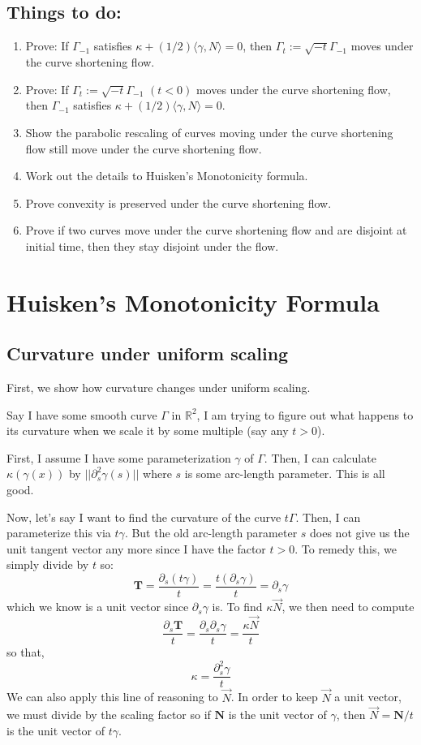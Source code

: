 \documentclass{article}
\begin{document}
\subsection{Things to do:}
\begin{enumerate}
    \item Prove: If $\Gamma_{-1}$ satisfies $\kappa + (1/2)\langle \gamma, N\rangle = 0$, then $\Gamma_t := \sqrt{-t}\Gamma_{-1}$ moves under the curve shortening flow.
    \item Prove: If $\Gamma_t := \sqrt{-t}\Gamma_{-1}$ $(t < 0)$ moves under the curve shortening flow, then $\Gamma_{-1}$ satisfies 
        $\kappa + (1/2)\langle\gamma,N\rangle = 0$.
    \item Show the parabolic rescaling of curves moving under the curve shortening flow still move under the curve shortening flow.
    \item Work out the details to Huisken's Monotonicity formula.
    \item Prove convexity is preserved under the curve shortening flow.
    \item Prove if two curves move under the curve shortening flow and are disjoint at initial time, then they stay disjoint under the flow.
\end{enumerate}

\section{Huisken's Monotonicity Formula}

\subsection{Curvature under uniform scaling}

First, we show how curvature changes under uniform scaling.

Say I have some smooth curve $\Gamma$ in $\mathbb{R}^2$, I am trying to figure out what happens to its curvature when we scale it by some multiple (say any $t>0$). 

First, I assume I have some parameterization $\gamma$ of $\Gamma$. Then, I can calculate $\kappa (\gamma(x))$ by $||\partial_s^2 \gamma(s)||$ where $s$ is 
some arc-length parameter. This is all good.

Now, let's say I want to find the curvature of the curve $t\Gamma$. Then,
I can parameterize this via $t\gamma$. But the old arc-length parameter $s$ does not give us the unit tangent vector any more since I have the factor $t>0$. 
To remedy this, we simply divide by $t$ so:
\[ \mathbf{T} = \frac{\partial_s(t\gamma)}{t}= \frac{t(\partial_s \gamma)}{t} = \partial_s \gamma \]
which we know is a unit vector since $\partial_s \gamma$ is. To find $\kappa \vec{N}$, we then need to compute 
\[ \frac{\partial_s\mathbf{T}}{t} = \frac{\partial_s \partial_s \gamma}{t} = \frac{\kappa\vec{N}}{t} \]
so that,
\[ \kappa = \frac{\partial_s^2 \gamma}{t} \]
We can also apply this line of reasoning to $\vec{N}$. In order to keep $\vec{N}$ a unit vector, we must divide by the scaling factor so if $\mathbf{N}$ is the
unit vector of $\gamma$, then $\vec{N} = \mathbf{N}/t$ is the unit vector of $t\gamma$.
\end{document}
